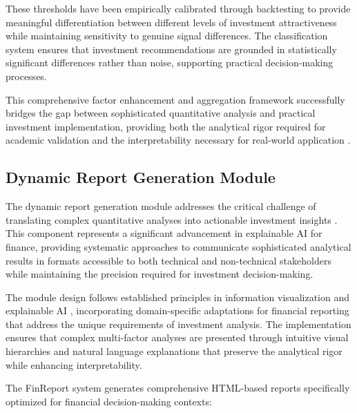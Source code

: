 \documentclass[3p,times,procedia]{elsarticle}
\begin{document}
These thresholds have been empirically calibrated through backtesting to provide meaningful differentiation between different levels of investment attractiveness while maintaining sensitivity to genuine signal differences. The classification system ensures that investment recommendations are grounded in statistically significant differences rather than noise, supporting practical decision-making processes.

This comprehensive factor enhancement and aggregation framework successfully bridges the gap between sophisticated quantitative analysis and practical investment implementation, providing both the analytical rigor required for academic validation and the interpretability necessary for real-world application \cite{Harvey2016,Ribeiro2016}.

\subsection{Dynamic Report Generation Module}

The dynamic report generation module addresses the critical challenge of translating complex quantitative analyses into actionable investment insights \cite{Ribeiro2016}. This component represents a significant advancement in explainable AI for finance, providing systematic approaches to communicate sophisticated analytical results in formats accessible to both technical and non-technical stakeholders while maintaining the precision required for investment decision-making.

The module design follows established principles in information visualization and explainable AI \cite{Ribeiro2016}, incorporating domain-specific adaptations for financial reporting that address the unique requirements of investment analysis. The implementation ensures that complex multi-factor analyses are presented through intuitive visual hierarchies and natural language explanations that preserve the analytical rigor while enhancing interpretability.

The FinReport system generates comprehensive HTML-based reports specifically optimized for financial decision-making contexts:
\end{document}
